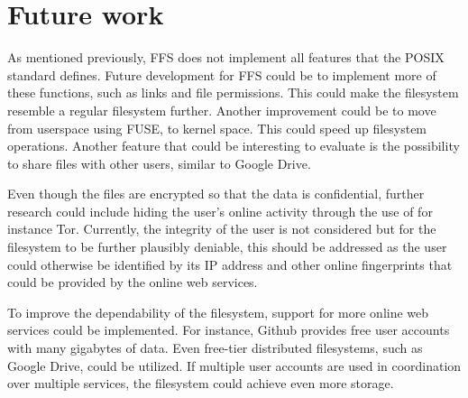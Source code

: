 
\section{Future work}
\label{sec:futureWork}

As mentioned previously, FFS does not implement all features that the POSIX standard defines. Future development for FFS could be to implement more of these functions, such as links and file permissions. This could make the filesystem resemble a regular filesystem further. Another improvement could be to move from userspace using FUSE, to kernel space. This could speed up filesystem operations. Another feature that could be interesting to evaluate is the possibility to share files with other users, similar to Google Drive.

Even though the files are encrypted so that the data is confidential, further research could include hiding the user's online activity through the use of for instance Tor. Currently, the integrity of the user is not considered but for the filesystem to be further plausibly deniable, this should be addressed as the user could otherwise be identified by its IP address and other online fingerprints that could be provided by the online web services.

To improve the dependability of the filesystem, support for more online web services could be implemented. For instance, Github provides free user accounts with many gigabytes of data. Even free-tier distributed filesystems, such as Google Drive, could be utilized. If multiple user accounts are used in coordination over multiple services, the filesystem could achieve even more storage.




